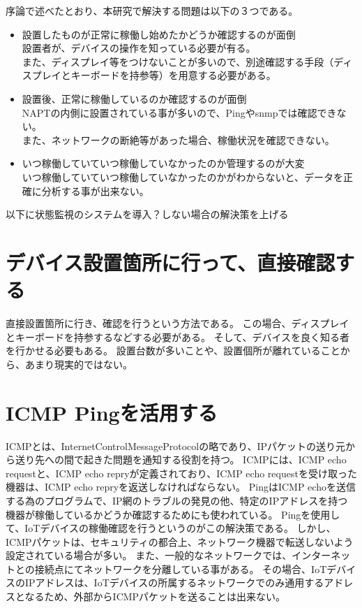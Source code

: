 序論で述べたとおり、本研究で解決する問題は以下の３つである。
\begin{itemize}
	\item 設置したものが正常に稼働し始めたかどうか確認するのが面倒\\
	設置者が、デバイスの操作を知っている必要が有る。\\
	また、ディスプレイ等をつけないことが多いので、別途確認する手段（ディスプレイとキーボードを持参等）を用意する必要がある。
	\item 設置後、正常に稼働しているのか確認するのが面倒\\
	NAPTの内側に設置されている事が多いので、Pingやsnmpでは確認できない。\\
	また、ネットワークの断絶等があった場合、稼働状況を確認できない。
	\item いつ稼働していていつ稼働していなかったのか管理するのが大変\\
	いつ稼働していていつ稼働していなかったのかがわからないと、データを正確に分析する事が出来ない。
\end{itemize}

以下に状態監視のシステムを導入？しない場合の解決策を上げる

\section{デバイス設置箇所に行って、直接確認する}
直接設置箇所に行き、確認を行うという方法である。
この場合、ディスプレイとキーボードを持参するなどする必要がある。
そして、デバイスを良く知る者を行かせる必要もある。
設置台数が多いことや、設置個所が離れていることから、あまり現実的ではない。

\section{ICMP Pingを活用する}
ICMPとは、InternetControlMessageProtocolの略であり、IPパケットの送り元から送り先への間で起きた問題を通知する役割を持つ。
ICMPには、ICMP echo requestと、ICMP echo repryが定義されており、ICMP echo requestを受け取った機器は、ICMP echo repryを返送しなければならない。
PingはICMP echoを送信する為のプログラムで、IP網のトラブルの発見の他、特定のIPアドレスを持つ機器が稼働しているかどうか確認するためにも使われている。
Pingを使用して、IoTデバイスの稼働確認を行うというのがこの解決策である。
しかし、ICMPパケットは、セキュリティの都合上、ネットワーク機器で転送しないよう設定されている場合が多い。
また、一般的なネットワークでは、インターネットとの接続点にてネットワークを分離している事がある。
その場合、IoTデバイスのIPアドレスは、IoTデバイスの所属するネットワークでのみ通用するアドレスとなるため、外部からICMPパケットを送ることは出来ない。

